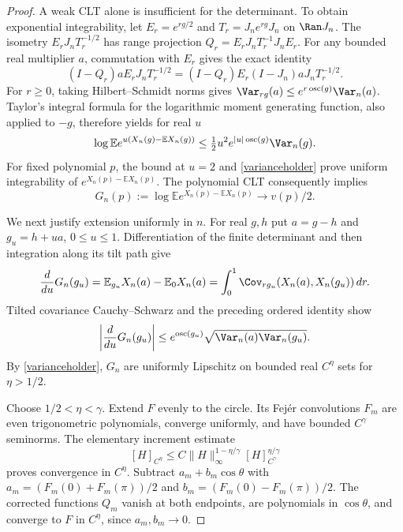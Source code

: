 \begin{proof}
A weak CLT alone is insufficient for the determinant. To obtain
exponential integrability, let $E_r=e^{rg/2}$ and
$T_r=J_ne^{rg}J_n$ on $\Ran J_n$. The isometry
$E_rJ_nT_r^{-1/2}$ has range projection
$Q_r=E_rJ_nT_r^{-1}J_nE_r$. For any bounded real multiplier $a$,
commutation with $E_r$ gives the exact identity
\[
 (I-Q_r)aE_rJ_nT_r^{-1/2}
   =(I-Q_r)E_r(I-J_n)aJ_nT_r^{-1/2}.
\]
For $r\ge0$, taking Hilbert--Schmidt norms gives
$\Var_{rg}(a)\le e^{r\operatorname{osc}(g)}\Var_n(a)$.
Taylor's integral formula for the logarithmic moment generating
function, also applied to $-g$, therefore yields for real $u$
\begin{equation}\label{exponentialbound}
 \log\mathbb E e^{u(X_n(g)-\mathbb EX_n(g))}
 \le \tfrac12u^2e^{|u|\operatorname{osc}(g)}\Var_n(g).
\end{equation}
For fixed polynomial $p$, the bound at $u=2$ and
\eqref{varianceholder} prove uniform integrability of
$e^{X_n(p)-\mathbb EX_n(p)}$. The polynomial CLT consequently implies
\begin{equation}\label{polynomialG}
 G_n(p):=\log\mathbb E e^{X_n(p)-\mathbb EX_n(p)}\longrightarrow v(p)/2.
\end{equation}

We next justify extension uniformly in $n$. For real $g,h$ put
$a=g-h$ and $g_u=h+ua$, $0\le u\le1$. Differentiation of the
finite determinant and then integration along its tilt path give
\[
 \frac{d}{du}G_n(g_u)
  =\mathbb E_{g_u}X_n(a)-\mathbb E_0X_n(a)
  =\int_0^1\Cov_{rg_u}(X_n(a),X_n(g_u))\,dr.
\]
Tilted covariance Cauchy--Schwarz and the preceding ordered identity
show
\begin{equation}\label{Gcontinuity}
 \left|\frac{d}{du}G_n(g_u)\right|
 \le e^{\operatorname{osc}(g_u)}
       \sqrt{\Var_n(a)\Var_n(g_u)}.
\end{equation}
By \eqref{varianceholder}, $G_n$ are uniformly Lipschitz on bounded
real $C^\eta$ sets for $\eta>1/2$.

Choose $1/2<\eta<\gamma$. Extend $F$ evenly to the circle.
Its Fej\'er convolutions $F_m$ are even trigonometric polynomials,
converge uniformly, and have bounded $C^\gamma$ seminorms.
The elementary increment estimate
\[
 [H]_{C^\eta}\le C\|H\|_\infty^{1-\eta/\gamma}
                        [H]_{C^\gamma}^{\eta/\gamma}
\]
proves convergence in $C^\eta$. Subtract
$a_m+b_m\cos\theta$ with
$a_m=(F_m(0)+F_m(\pi))/2$ and
$b_m=(F_m(0)-F_m(\pi))/2$. The corrected functions $Q_m$ vanish
at both endpoints, are polynomials in $\cos\theta$, and converge
to $F$ in $C^\eta$, since $a_m,b_m\to0$.


\end{proof}
